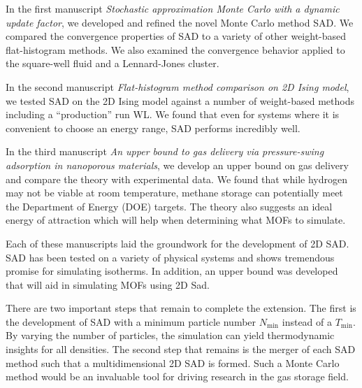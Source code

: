 In the first manuscript \emph{Stochastic approximation Monte Carlo with a
dynamic update factor}, we developed and refined the novel Monte Carlo method
SAD. We compared the convergence properties of SAD to a variety of other
weight-based flat-histogram methods. We also examined the convergence behavior
applied to the square-well fluid and a Lennard-Jones cluster.

In the second manuscript \emph{Flat-histogram method comparison on 2D Ising
model}, we tested SAD on the 2D Ising model against a number of weight-based
methods including a ``production'' run WL. We found that even for systems where
it is convenient to choose an energy range, SAD performs incredibly well.

In the third manuscript \emph{An upper bound to gas delivery via pressure-swing
adsorption in nanoporous materials}, we develop an upper bound on gas delivery
and compare the theory with experimental data. We found that while hydrogen may
not be viable at room temperature, methane storage can potentially meet the
Department of Energy (DOE) targets. The theory also suggests an ideal energy of
attraction which will help when determining what MOFs to simulate.

Each of these manuscripts laid the groundwork for the development of 2D SAD.
SAD has been tested on a variety of physical systems and shows tremendous
promise for simulating isotherms. In addition, an upper bound was developed
that will aid in simulating MOFs using 2D Sad.

There are two important steps that remain to complete the extension. The first
is the development of SAD with a minimum particle number $N_{\min}$ instead of
a $T_{\min}$. By varying the number of particles, the simulation can yield
thermodynamic insights for all densities. The second step that remains is the
merger of each SAD method such that a multidimensional 2D SAD is formed. Such a
Monte Carlo method would be an invaluable tool for driving research in the gas
storage field.